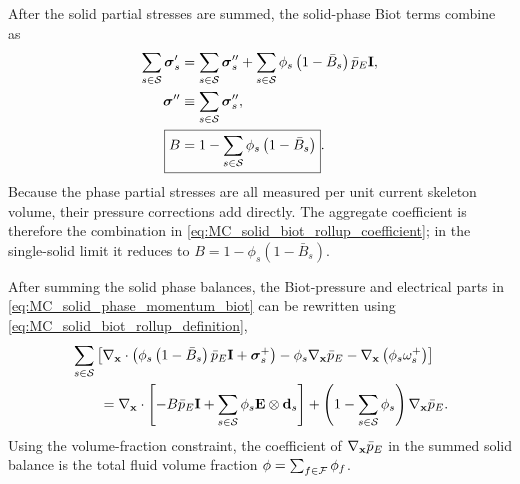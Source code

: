 After the solid partial stresses are summed, the solid-phase Biot terms combine
as
%
\begin{align}
	\sum_{s\in\mc S}\bs\sigma_s'
	 & =
	\sum_{s\in\mc S}\bs\sigma_s^{\prime\prime}
	+
	\sum_{s\in\mc S}
	\phi_s\left(1-\bar B_s\right)\bar p_E\mbf I,
	\label{eq:MC_solid_biot_rollup_expanded}   \\
	\bs\sigma^{\prime\prime}
	 & \equiv
	\sum_{s\in\mc S}\bs\sigma_s^{\prime\prime},
	\label{eq:MC_solid_biot_rollup_definition} \\
	\Aboxed{
		B
	 & =
		1-\sum_{s\in\mc S}\phi_s\left(1-\bar B_s\right)
	}
	.
	\label{eq:MC_solid_biot_rollup_coefficient}
\end{align}
%
Because the phase partial stresses are all measured per unit current skeleton
volume, their pressure corrections add directly.  The aggregate coefficient is
therefore the combination in
\eqref{eq:MC_solid_biot_rollup_coefficient}; in the single-solid limit it
reduces to \(B=1-\phi_s\left(1-\bar B_s\right)\).

After summing the solid phase balances, the Biot-pressure and electrical parts in
\eqref{eq:MC_solid_phase_momentum_biot} can be rewritten using
\eqref{eq:MC_solid_biot_rollup_definition},
%
\begin{equation}
	\begin{aligned}
		 & \sum_{s\in\mathcal{S}}
		\left[
			\nabla_{\mathbf{x}}\cdot
			\left(
			\phi_s\left(1-\bar B_s\right)\bar p_E\mathbf{I}
			+\boldsymbol{\sigma}_s^+
			\right)
			-\phi_s\nabla_{\mathbf{x}}\bar p_E
			-\nabla_{\mathbf{x}}\left(\phi_s\omega_s^+\right)
			\right]
		\\
		 & \qquad =
		\nabla_{\mathbf{x}}\cdot
		\left[
			-B\bar p_E\mathbf{I}
			+
			\sum_{s\in\mathcal{S}}
			\phi_s\mathbf{E}\otimes\mathbf{d}_s
			\right]
		+
		\left(
		1-\sum_{s\in\mathcal{S}}\phi_s
		\right)
		\nabla_{\mathbf{x}}\bar p_E .
	\end{aligned}
	\label{eq:solid_biot_pressure_remainder_rollup}
\end{equation}
%
Using the volume-fraction constraint, the coefficient of
\(\nabla_{\mathbf{x}}\bar p_E\) in the summed solid balance is the total fluid
volume fraction \(\phi=\sum_{f\in\mathcal{F}}\phi_f\).

